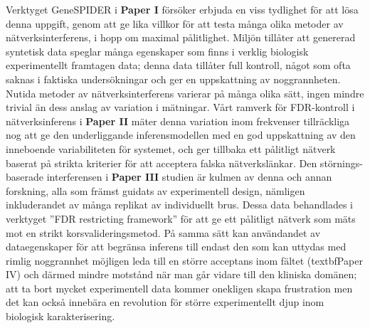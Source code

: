 Verktyget GeneSPIDER i \textbf{Paper I} försöker erbjuda en viss tydlighet för att lösa denna uppgift, genom att ge lika villkor för att testa många olika metoder av nätverksinterferens, i hopp om maximal pålitlighet. Miljön tillåter att genererad syntetisk data speglar många egenskaper som finns i verklig biologisk experimentellt framtagen data; denna data tillåter full kontroll, något som ofta saknas i faktiska undersökningar och ger en uppskattning av noggrannheten. Nutida metoder av nätverksinterferens varierar på många olika sätt, ingen mindre trivial än dess anslag av variation i mätningar. Vårt ramverk för FDR-kontroll i nätverksinferens i \textbf{Paper II} mäter denna variation inom frekvenser tillräckliga nog att ge den underliggande inferensmodellen med en god uppskattning av den inneboende variabiliteten för systemet, och ger tillbaka ett pålitligt nätverk baserat på strikta kriterier för att acceptera falska nätverkslänkar. Den störnings-baserade interferensen i \textbf{Paper III}  studien är kulmen av denna och annan forskning, alla som främst guidats av experimentell design, nämligen inkluderandet av många replikat av individuellt brus. Dessa data behandlades i verktyget ”FDR restricting framework” för att ge ett pålitligt nätverk som mäts mot en strikt korsvalideringsmetod. På samma sätt kan användandet av dataegenskaper för att begränsa inferens till endast den som kan uttydas med rimlig noggrannhet möjligen leda till en större acceptans inom fältet (textbf{Paper IV}) och därmed mindre motstånd när man går vidare till den kliniska domänen; att ta bort mycket experimentell data kommer onekligen skapa frustration men det kan också innebära en revolution för större experimentellt djup inom biologisk karakterisering. \\







